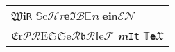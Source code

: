 \documentclass[border = 2pt]{standalone}
\begin{document}
\begin{tabular}{l}
    {\Large$\mathfrak{W}$}{\textbf{i}}{\large\texttt{R}} \quad
    {$\mathbb{S}$}{\scriptsize\textrm{c}}{\Huge$\mathcal{H}$}{\LARGE\textit{r}}{\footnotesize$\mathbf{e}$}{\small$\mathfrak{I}$}{$\mathcal{B}$}{\Large$\mathbb{E}$}{\textbf{\textit{n}}} \quad
    {\small\textrm{\textbf{ei}}}{\Large$\mathsf{n}$}{$\mathcal{EN}$} \\
    {\Large$\mathfrak{E}$}{\textrm{r}}{\large$\mathcal{PR}$}{\tiny E}{\small$\mathfrak{SS}$}{\large e}{$\mathcal{R}$}{\Huge$\mathfrak{b}$}{$\mathcal{R}$}{\scriptsize$\mathbb{I}$}{\large e}{\Large$\mathcal{F}$} \quad
    {\textbf{\textit{m}}}{\footnotesize \texttt{It}} \quad
    {\Huge$\mathbb{T}$}{\Large\textbf{\texttt{e}}}{\small$\mathfrak{X}$}
\end{tabular}
\end{document}
